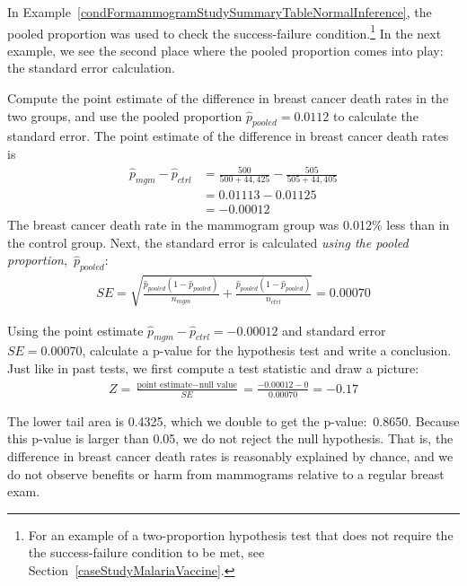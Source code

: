 In Example~\ref{condFormammogramStudySummaryTableNormalInference},
the pooled proportion was used to check the success-failure
condition.\footnote{For an example of a two-proportion
  hypothesis test that does not require the the
  success-failure condition to be met, see
  Section~\ref{caseStudyMalariaVaccine}.}
In the next example, we see the second place where the pooled
proportion comes into play: the standard error calculation.

\begin{examplewrap}
\begin{nexample}{Compute the point estimate of the difference
    in breast cancer death rates in the two groups,
    and use the pooled proportion
    $\hat{p}_{\textit{pooled}} = 0.0112$ to calculate
    the standard error.}
  The point estimate of the difference in breast cancer death
  rates is
  \begin{align*}
  \hat{p}_{mgm} - \hat{p}_{ctrl}
    &= \frac{500}{500 + 44,425} - \frac{505}{505 + 44,405} \\
    &= 0.01113 - 0.01125 \\
    &= -0.00012
  \end{align*}
  The breast cancer death rate in the mammogram group
  was 0.012\% less than in the control group.
  Next, the standard error is calculated
  \emph{using the pooled proportion},~$\hat{p}_{\textit{pooled}}$:
\begin{align*}
SE = \sqrt{
      \frac{\hat{p}_{\textit{pooled}}(1-\hat{p}_{\textit{pooled}})}
          {n_{mgm}}
      + \frac{\hat{p}_{\textit{pooled}}(1-\hat{p}_{\textit{pooled}})}
          {n_{ctrl}}
    }
	= 0.00070
\end{align*}
\end{nexample}
\end{examplewrap}

\begin{examplewrap}
\begin{nexample}{Using the point estimate $\hat{p}_{mgm} - \hat{p}_{ctrl} = -0.00012$ and standard error $SE = 0.00070$, calculate a p-value for the hypothesis test and write a conclusion.}
Just like in past tests, we first compute a test statistic and draw a picture:
\begin{align*}
Z = \frac{\text{point estimate} - \text{null value}}{SE}
	= \frac{-0.00012 - 0}{0.00070}
	= -0.17
\end{align*}
\begin{center}
\end{center}
The lower tail area is 0.4325, which we double to get the p-value:~0.8650. Because this p-value is larger than 0.05, we do not reject the null hypothesis. That is, the difference in breast cancer death rates is reasonably explained by chance, and we do not observe benefits or harm from mammograms relative to a regular breast exam.
\end{nexample}
\end{examplewrap}

